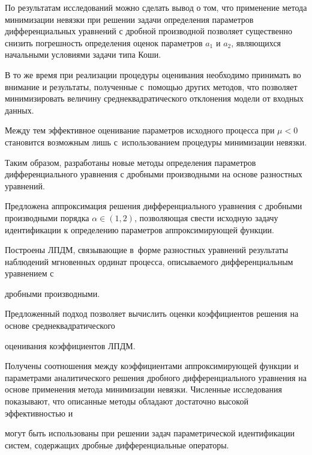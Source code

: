 
По результатам исследований можно сделать вывод о том, что применение метода минимизации невязки при решении задачи определения параметров дифференциальных уравнений с дробной производной позволяет существенно снизить погрешность определения оценок параметров $a_1$ и $a_2$, являющихся начальными условиями задачи типа Коши.


В то же время при реализации процедуры оценивания необходимо принимать во внимание и результаты, полученные с~помощью других методов, что позволяет минимизировать величину среднеквадратического отклонения модели от входных данных. 

Между тем эффективное оценивание параметров исходного процесса при $\mu<0$ становится возможным лишь с~использованием процедуры минимизации невязки.




Таким образом, разработаны новые методы определения параметров дифференциального уравнения с дробными производными на основе разностных уравнений. 

Предложена аппроксимация решения дифференциального уравнения с дробными производными порядка $\alpha \in (1, 2)$, позволяющая свести исходную задачу идентификации к определению параметров аппроксимирующей функции. 

Построены ЛПДМ, связывающие в~форме разностных уравнений результаты наблюдений мгновенных ординат процесса, описываемого дифференциальным уравнением с

дробными производными. 

Предложенный подход позволяет вычислить оценки коэффициентов решения на основе среднеквадратического 

оценивания коэффициентов ЛПДМ. 

Получены соотношения между коэффициентами аппроксимирующей функции и параметрами аналитического решения дробного дифференциального уравнения на основе применения метода минимизации невязки. Численные исследования показывают, что описанные методы обладают достаточно высокой эффективностью и

могут быть использованы при решении задач параметрической идентификации систем, содержащих дробные дифференциальные операторы.






